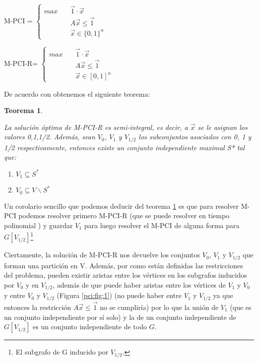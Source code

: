 \documentclass[a4paper,12pt,titlepage]{article}
\newtheorem{teo}{Teorema}[section]
\begin{document}
\begin{minipage}{.5\textwidth}
M-PCI =
$
\left\{\begin{aligned}
max \quad & \overrightarrow{1}\cdot\overrightarrow{x} \\
    & A\overrightarrow{x}\leq \overrightarrow{1} \label{pci:1}\\
    & \overrightarrow{x} \in \{0,1\}^n
\end{aligned}\right.
$
\end{minipage}
\begin{minipage}{.5\textwidth}

M-PCI-R=
$
\left\{\begin{aligned}
max \quad & \overrightarrow{1}\cdot\overrightarrow{x} \\
    & A\overrightarrow{x}\leq \overrightarrow{1} \\
    & \overrightarrow{x} \in [0,1]^n
\end{aligned}\right.
$
\end{minipage}

\vspace{\baselineskip}

De acuerdo con \cite{max-pci1} obtenemos el siguiente teorema:

\begin{teo} 
\label{pci:teo:1}

La soluci\'on \'optima de M-PCI-R es semi-integral, es decir, a $\overrightarrow{x}$ se le asignan los valores {0,1,1/2}. Adem\'as, sean $V_0$, $V_1$ y $V_{1/2}$ los subconjuntos asociados con 0, 1 y 1/2 respectivamente, entonces existe un conjunto independiente maximal S* tal que:

\begin{enumerate}
\item $V_1 \subseteq S^*$
\item $V_0 \subseteq V{\backslash}S^*$
\end{enumerate}

\end{teo}

Un corolario sencillo que podemos deducir del teorema \ref{pci:teo:1} es que para resolver M-PCI podemos resolver primero M-PCI-R (que se puede resolver en tiempo polinomial \cite{max-pci2}) y guardar $V_1$ para luego resolver el M-PCI de alguna forma para $G[V_{1/2}]$\footnote{El subgrafo de G inducido por $V_{1/2}$.}

Ciertamente, la soluci\'on de M-PCI-R nos devuelve los conjuntos $V_0$, $V_1$ y $V_{1/2}$ que forman una partici\'on en V. Adem\'as, por como est\'an definidas las restricciones del problema, pueden existir aristas entre los v\'ertices en los subgrafos inducidos por $V_0$ y en $V_{1/2}$, adem\'as de que puede haber aristas entre los v\'ertices de $V_1$ y $V_0$ y entre $V_0$ y $V_{1/2}$ (Figura \ref{pci:fig:1}) (no puede haber entre $V_1$ y $V_{1/2}$ ya que entonces la restricci\'on $A\overrightarrow{x} \leq \overrightarrow{1}$ no se cumplir\'ia) por lo que la uni\'on de $V_1$ (que es un conjunto independiente por s\'i solo) y la de un conjunto independiente de $G[V_{1/2}]$ es un conjunto independiente de todo $G$.
\end{document}
